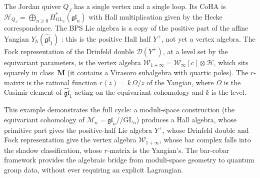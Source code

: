 \begin{example}
\label{ex:jordan-coha}
The Jordan quiver $Q_J$ has a single vertex and a single loop.
Its CoHA is
$\mathcal{H}_{Q_J} = \bigoplus_{n \ge 0}
H^*_{\mathrm{GL}_n}(\mathfrak{gl}_n)$
with Hall multiplication given by the Hecke correspondence.
The BPS Lie algebra is a copy of the positive part
of the affine Yangian $Y_\hbar(\widehat{\mathfrak{gl}}_1)$
\cite{SV13}: this is the positive Hall half $Y^+$, not yet a
vertex algebra. The Fock representation of the Drinfeld double
$\mathcal{D}(Y^+)$, at a level set by the equivariant parameters,
is the vertex algebra $\mathcal{W}_{1+\infty} = \mathcal{W}_\infty[c] \otimes \mathcal{H}$,
which sits squarely in class~$\mathbf{M}$ (it contains a Virasoro
subalgebra with quartic poles). The $r$-matrix is the rational function
$r(z) = k\,\Omega/z$ of the Yangian, where $\Omega$ is the
Casimir element of $\widehat{\mathfrak{gl}}_1$ acting on
the equivariant cohomology and $k$ is the level.

This example demonstrates the full cycle: a moduli-space
construction (the equivariant cohomology of
$\mathcal{M}_n = \mathfrak{gl}_n /\!\!/ \mathrm{GL}_n$)
produces a Hall algebra, whose primitive part gives the positive-half
Lie algebra $Y^+$, whose Drinfeld double and Fock representation give
the vertex algebra $\mathcal{W}_{1+\infty}$, whose
bar complex falls into the shadow classification, whose
$r$-matrix is the Yangian's. The bar-cobar framework provides
the algebraic bridge from moduli-space geometry to quantum group
data, without ever requiring an explicit Lagrangian.
\end{example}

